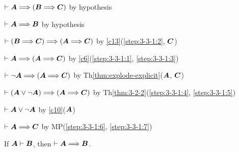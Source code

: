 \begin{pf}
\item\label{step:3-3-1:1} $\vdash\boldsymbol{A}\Longrightarrow(\boldsymbol{B}\Longrightarrow\boldsymbol{C})$
  by hypothesis
\item\label{step:3-3-1:2} $\vdash\boldsymbol{A}\Longrightarrow\boldsymbol{B}$
  by hypothesis
\item\label{step:3-3-1:3} $\vdash(\boldsymbol{B}\Longrightarrow\boldsymbol{C})\Longrightarrow(\boldsymbol{A}\Longrightarrow\boldsymbol{C})$
  by \ref{c13}(\ref{step:3-3-1:2}, $\boldsymbol{C}$)
\item\label{step:3-3-1:4} $\vdash\boldsymbol{A}\Longrightarrow(\boldsymbol{A}\Longrightarrow\boldsymbol{C})$
  by \ref{c6}(\ref{step:3-3-1:1}, \ref{step:3-3-1:3})
\item\label{step:3-3-1:5} $\vdash\neg\boldsymbol{A}\Longrightarrow(\boldsymbol{A}\Longrightarrow\boldsymbol{C})$
  by Th\ref{thm:explode-explicit}($\boldsymbol{A}$, $\boldsymbol{C}$)
\item\label{step:3-3-1:6} $\vdash(\boldsymbol{A}\lor\neg\boldsymbol{A})\Longrightarrow(\boldsymbol{A}\Longrightarrow\boldsymbol{C})$
  by Th\ref{thm:3-2-2}(\ref{step:3-3-1:4}, \ref{step:3-3-1:5})
\item\label{step:3-3-1:7} $\vdash\boldsymbol{A}\lor\neg\boldsymbol{A}$
  by \ref{c10}($\boldsymbol{A}$)
\item\label{step:3-3-1:8} $\vdash\boldsymbol{A}\Longrightarrow\boldsymbol{C}$
  by MP(\ref{step:3-3-1:6}, \ref{step:3-3-1:7})
\end{pf}

\begin{dc}\label{c14}%
If $\boldsymbol{A}\vdash\boldsymbol{B}$, then $\vdash\boldsymbol{A}\Longrightarrow\boldsymbol{B}$.
\end{dc}

